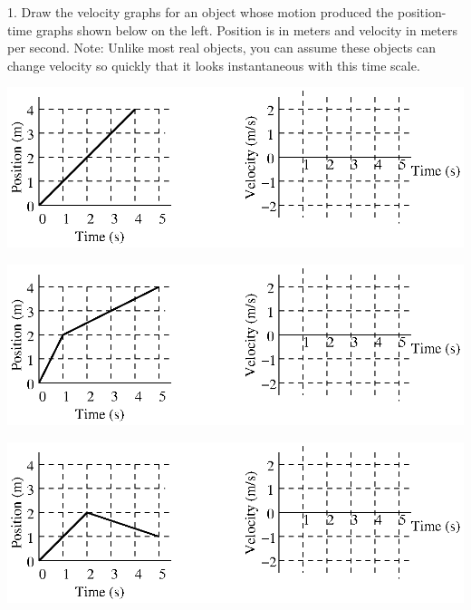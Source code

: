 1. Draw the velocity graphs for an object whose motion produced the position-time
graphs shown below on the left. Position is in meters and velocity in meters
per second. Note: Unlike most real objects, you can assume these objects can
change velocity so quickly that it looks instantaneous with this time scale.

\vspace{0.3cm}
{\par\centering \includegraphics{relating/relating_fig3.eps} \par}
\vspace{0.3cm}

\vspace{0.3cm}
{\par\centering \includegraphics{relating/relating_fig4.eps} \par}
\vspace{0.3cm}

\vspace{0.3cm}
{\par\centering \includegraphics{relating/relating_fig5.eps} \par}
\vspace{0.3cm}


